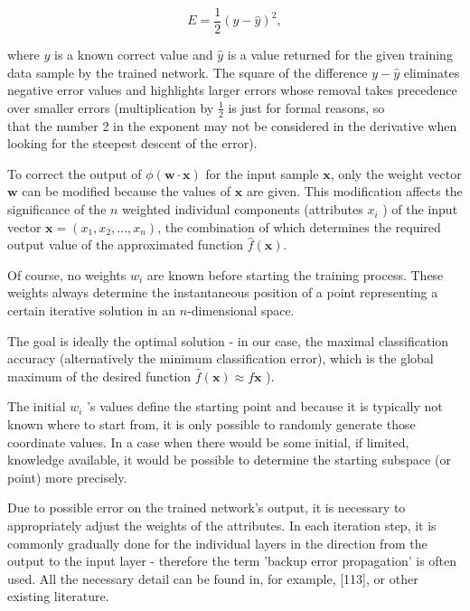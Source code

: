 \documentclass[10pt]{book}
\begin{document}
\begin{equation*}
E=\frac{1}{2}(y-\hat{y})^{2}, \tag{11.2}
\end{equation*}


where $y$ is a known correct value and $\hat{y}$ is a value returned for the given training data sample by the trained network. The square of the difference $y-\hat{y}$ eliminates negative error values and highlights larger errors whose removal takes precedence over smaller errors (multiplication by $\frac{1}{2}$ is just for formal reasons, so\\
that the number 2 in the exponent may not be considered in the derivative when looking for the steepest descent of the error).

To correct the output of $\phi(\mathbf{w} \cdot \mathbf{x})$ for the input sample $\mathbf{x}$, only the weight vector $\mathbf{w}$ can be modified because the values of $\mathbf{x}$ are given. This modification affects the significance of the $n$ weighted individual components (attributes $x_{i}$ ) of the input vector $\mathbf{x}=\left(x_{1}, x_{2}, \ldots, x_{n}\right)$, the combination of which determines the required output value of the approximated function $\hat{f}(\mathbf{x})$.

Of course, no weights $w_{i}$ are known before starting the training process. These weights always determine the instantaneous position of a point representing a certain iterative solution in an $n$-dimensional space.

The goal is ideally the optimal solution - in our case, the maximal classification accuracy (alternatively the minimum classification error), which is the global maximum of the desired function $\hat{f}(\mathbf{x}) \approx f \mathbf{x}$ ).

The initial $w_{i}$ 's values define the starting point and because it is typically not known where to start from, it is only possible to randomly generate those coordinate values. In a case when there would be some initial, if limited, knowledge available, it would be possible to determine the starting subspace (or point) more precisely.

Due to possible error on the trained network's output, it is necessary to appropriately adjust the weights of the attributes. In each iteration step, it is commonly gradually done for the individual layers in the direction from the output to the input layer - therefore the term 'backup error propagation' is often used. All the necessary detail can be found in, for example, [113], or other existing literature.
\end{document}
